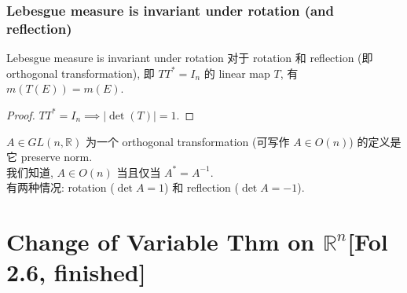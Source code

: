 \documentclass[lang=cn,11pt]{elegantbook}
\begin{document}
\subsection{Lebesgue measure is invariant under rotation (and reflection)}
\begin{corollary}{Lebesgue measure is invariant under rotation}
    对于 rotation 和 reflection (即 orthogonal transformation), 即 $TT^* = I_n$ 的 linear map $T$, 有 $m(T(E))  = m(E)$.
\end{corollary}
\begin{proof}
    $TT^* = I_n \implies |\det (T)| = 1$. 
\end{proof}
\begin{remark}
    $A \in GL(n,\mathbb{R})$ 为一个 orthogonal transformation (可写作 $A \in O(n)$) 的定义是它 preserve norm.\\
我们知道, $A \in O(n)$ 当且仅当 $A^* = A^{-1}$.\\
有两种情况: rotation ($\det A = 1$) 和 reflection ($\det A = -1$).\\
\end{remark}


\chapter{Change of Variable Thm on $\mathbb{R}^n$[Fol 2.6, finished]}
\end{document}
